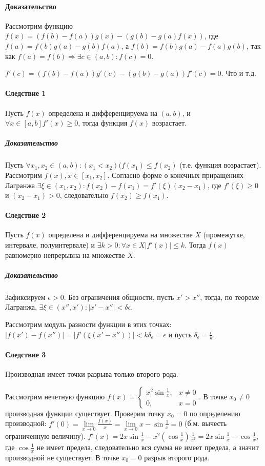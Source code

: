 \documentclass[10pt]{article}
\newcommand{\limx}[1]{\lim\limits_{x \to #1}}
\begin{document}
				\paragraph{Доказательство}
					Рассмотрим функцию $f(x) = (f(b) - f(a))g(x) - (g(b)-g(a)f(x))$, где $f(a) = f(b)g(a) - g(b)f(a)$, а $f(b) = f(b)g(a) - f(a)g(b)$, так как $f(a) = f(b) \Rightarrow \exists c \in (a, b) : f(c) = 0$.
					
					$f'(c) = (f(b) - f(a))g'(c) - (g(b)-g(a))f'(c) = 0$. Что и т.д.
					
				\paragraph{Следствие 1}
				Пусть $f(x)$ определена и дифференцируема на $(a, b)$, и $\forall x \in [a, b] f'(x) \geq 0$, тогда функция $f(x)$ возрастает.
				\subparagraph{Доказательство}
					Пусть $\forall x_1, x_2 \in (a, b) : (x_1 < x_2) (f(x_1) \leq f(x_2)$ (т.е. функция возрастает). Рассмотрим $f(x), x \in [x_1, x_2]$. Согласно форме о конечных приращениях Лагранжа $\exists \xi \in (x_1, x_2) : f(x_2) - f(x_1) = f'(\xi)(x_2 - x_1)$, где $f'(\xi) \geq 0$ и $(x_2-x_1) > 0$, следовательно $f(x_2) \geq f(x_1)$. %
					
				\paragraph{Следствие 2}
				Пусть $f(x)$ определена и дифференцируема на множестве $X$ (промежутке, интервале, полуинтервале) и $\exists k > 0 : \forall x \in X |f'(x)| \leq k$. Тогда $f(x)$ равномерно непрерывна на множестве $X$.
				\subparagraph{Доказательство}
					Зафиксируем $\epsilon > 0$. Без ограничения общности, пусть $x' > x''$, тогда, по теореме Лагранжа, $\exists \xi \in (x'', x') : |x' - x''| < \delta \epsilon$.
					
					Рассмотрим модуль разности функции в этих точках: $|f(x') - f(x'')| = |f'(\xi(x'-x''))| < k\delta_\epsilon = \epsilon$ и пусть $\delta_\epsilon = \frac{\epsilon}{k}$.
				\paragraph{Следствие 3} 
					Производная имеет точки разрыва только второго рода.
			
					Рассмотрим нечетную функцию $f(x) = \begin{cases}
						x^2\sin{\frac{1}{x}}, & x \neq 0 \\
						0, & x = 0
					\end{cases}$. В точке $x_0 \neq 0$ производная функции существует. Проверим точку $x_0 = 0$ по определению производной: $f'(0) = \limx{0} \frac{f(x)}{x} = \limx{0} x - \sin\frac{1}{x} = 0$ (б.м. вычесть ограниченную величину). $f'(x) = 2x\sin\frac{1}{x} - x^2(\cos\frac{1}{x})\frac{1}{x^2} = 2x\sin\frac{1}{x} - \cos\frac{1}{x}$, где $\cos\frac{1}{x}$ не имеет предела, следовательно вся сумма не имеет предела, а значит производной не существует. В точке $x_0 = 0$ разрыв второго рода.
		
\end{document}
